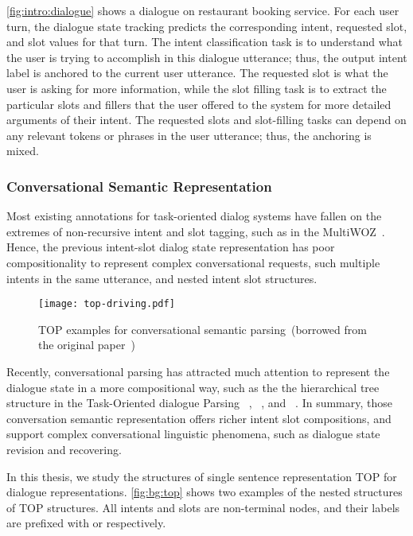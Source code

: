 \autoref{fig:intro:dialogue} shows a dialogue on restaurant booking
service. For each user turn, the dialogue state tracking predicts the
corresponding intent, requested slot, and slot values for that
turn. The intent classification task is to understand what the user is
trying to accomplish in this dialogue utterance; thus, the output
intent label is anchored to the current user utterance. The requested
slot is what the user is asking for more information, while the slot
filling task is to extract the particular slots and fillers that the
user offered to the system for more detailed arguments of their
intent. The requested slots and slot-filling tasks can depend on any
relevant tokens or phrases in the user utterance; thus, the anchoring
is mixed.

\subsubsection{Conversational Semantic Representation}
\label{ssec:bg:dialogue-rep}
Most existing annotations for task-oriented dialog systems have fallen
on the extremes of non-recursive intent and slot tagging, such as in
the MultiWOZ~\cite{budzianowski2018multiwoz}. Hence, the previous
intent-slot dialog state representation has poor compositionality to
represent complex conversational requests, such multiple intents in the
same utterance, and nested intent slot structures.

\begin{figure}[!th]
\centering
\texttt{[image: top-driving.pdf]}
\caption{\label{fig:bg:top} TOP examples for conversational
  semantic parsing~(borrowed from the original
  paper~\citep{gupta-etal-2018-semantic-parsing})}
\end{figure}
Recently, conversational parsing has attracted much attention to
represent the dialogue state in a more compositional way, such as the
the hierarchical tree structure in the Task-Oriented dialogue Parsing
~\cite[TOP,][]{gupta-etal-2018-semantic-parsing,aghajanyan2020conversational},
~\cite[TreeDST,][]{cheng2020conversational}, and
~\cite[Dataflow,][]{andreas2020task}. In summary, those conversation
semantic representation offers richer intent slot compositions, and
support complex conversational linguistic phenomena, such as dialogue
state revision and recovering.

In this thesis, we study the structures of single sentence
representation TOP for dialogue
representations. \autoref{fig:bg:top} shows two examples of the
nested structures of TOP structures. All intents and slots are
non-terminal nodes, and their labels are prefixed with  or
 respectively.

